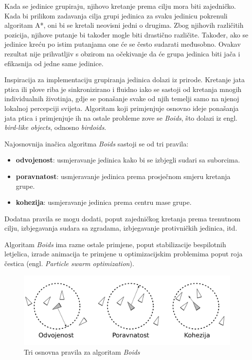 \documentclass[times, utf8, zavrsni, numeric]{fer}
\begin{document}
\par Kada se jedinice grupiraju, njihovo kretanje prema cilju mora biti zajedničko.
Kada bi prilikom zadavanja cilja grupi jedinica za svaku jedinicu pokrenuli algoritam A*, oni bi se kretali neovisni jedni o drugima. 
Zbog njihovih različitih pozicija, njihove putanje bi također mogle biti drastično različite. 
Također, ako se jedinice kreću po istim putanjama one će se često sudarati međusobno. 
Ovakav rezultat nije prihvatljiv s obzirom na očekivanje da će grupa jedinica biti jača i efikasnija od jedne same jedinice.

\par Inspiracija za implementaciju grupiranja jedinica dolazi iz prirode. 
Kretanje jata ptica ili plove riba je sinkronizirano i fluidno iako se sastoji od kretanja mnogih individualnih životinja, gdje se ponašanje svake od njih temelji samo na njenoj lokalnoj percepciji svijeta.
Algoritam koji primjenjuje osnovno ideje ponašanja jata ptica i primjenjuje ih na ostale probleme zove se \textit{Boids}, što dolazi iz engl. \textit{bird-like objects}, odnosno \textit{birdoids}\cite{article:FlocksHerdsSchools}.

\par Najosnovnija inačica algoritma \textit{Boids} sastoji se od tri pravila:
\begin{itemize}
	\item \textbf{odvojenost}: usmjeravanje jedinica kako bi se izbjegli sudari sa suborcima.
	\item \textbf{poravnatost}: usmjeravanje jedinica prema prosječnom smjeru kretanja grupe.
	\item \textbf{kohezija}: usmjeravanje jedinica prema centru mase grupe. 	 
\end{itemize}
Dodatna pravila se mogu dodati, poput zajedničkog kretanja prema trenutnom cilju, izbjegavanja sudara sa zgradama, izbjegavanje protivničkih jedinica, itd.

\par Algoritam \textit{Boids} ima razne ostale primjene, poput stabilizacije bespilotnih letjelica, izrade animacija te primjene u optimizacijskim problemima poput roja čestica (engl. \textit{Particle swarm optimization}).

\begin{figure}[h]
	\centering
	\includegraphics[width=1.0\linewidth]{images/boids.pdf}
	\caption{Tri osnovna pravila za algoritam \textit{Boids}}
	\label{fig:boids}
\end{figure}
\end{document}
